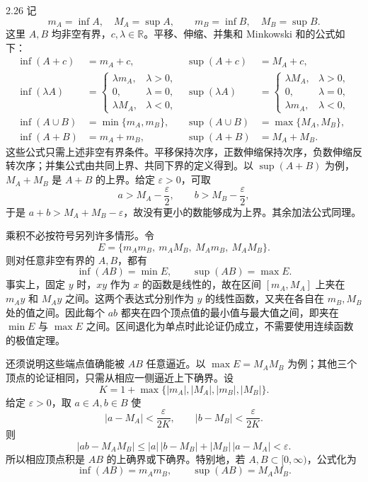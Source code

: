 \begin{solution}{2.26}
记
\[
 m_A=\inf A,\quad M_A=\sup A,
 \qquad m_B=\inf B,\quad M_B=\sup B.
\]
这里 \(A,B\) 均非空有界，\(c,\lambda\in\mathbb R\)。平移、伸缩、并集和 Minkowski 和的公式如下：
\begin{align*}
 \inf(A+c)&=m_A+c,& \sup(A+c)&=M_A+c,\\
 \inf(\lambda A)&=
 \begin{cases}
  \lambda m_A,&\lambda>0,\\
  0,&\lambda=0,\\
  \lambda M_A,&\lambda<0,
 \end{cases}
 &
 \sup(\lambda A)&=
 \begin{cases}
  \lambda M_A,&\lambda>0,\\
  0,&\lambda=0,\\
  \lambda m_A,&\lambda<0,
 \end{cases}\\
 \inf(A\cup B)&=\min\{m_A,m_B\},&
 \sup(A\cup B)&=\max\{M_A,M_B\},\\
 \inf(A+B)&=m_A+m_B,&
 \sup(A+B)&=M_A+M_B.
\end{align*}
这些公式只需上述非空有界条件。平移保持次序，正数伸缩保持次序，负数伸缩反转次序；并集公式由共同上界、共同下界的定义得到。以 \(\sup(A+B)\) 为例，\(M_A+M_B\) 是 \(A+B\) 的上界。给定 \(\varepsilon>0\)，可取
\[
 a>M_A-\frac{\varepsilon}{2},\qquad
 b>M_B-\frac{\varepsilon}{2},
\]
于是 \(a+b>M_A+M_B-\varepsilon\)，故没有更小的数能够成为上界。其余加法公式同理。

乘积不必按符号另列许多情形。令
\[
 E=\{m_Am_B,\ m_AM_B,\ M_Am_B,\ M_AM_B\}.
\]
则对任意非空有界的 \(A,B\)，都有
\[
 \inf(AB)=\min E,
 \qquad
 \sup(AB)=\max E.
\]
事实上，固定 \(y\) 时，\(xy\) 作为 \(x\) 的函数是线性的，故在区间 \([m_A,M_A]\) 上夹在 \(m_Ay\) 和 \(M_Ay\) 之间。这两个表达式分别作为 \(y\) 的线性函数，又夹在各自在 \(m_B,M_B\) 处的值之间。因此每个 \(ab\) 都夹在四个顶点值的最小值与最大值之间，即夹在 \(\min E\) 与 \(\max E\) 之间。区间退化为单点时此论证仍成立，不需要使用连续函数的极值定理。

还须说明这些端点值确能被 \(AB\) 任意逼近。以 \(\max E=M_AM_B\) 为例；其他三个顶点的论证相同，只需从相应一侧逼近上下确界。设
\[
 K=1+\max\{|m_A|,|M_A|,|m_B|,|M_B|\}.
\]
给定 \(\varepsilon>0\)，取 \(a\in A,b\in B\) 使
\[
 |a-M_A|<\frac{\varepsilon}{2K},
 \qquad
 |b-M_B|<\frac{\varepsilon}{2K}.
\]
则
\[
 |ab-M_AM_B|
 \le |a|\,|b-M_B|+|M_B|\,|a-M_A|
 <\varepsilon.
\]
所以相应顶点积是 \(AB\) 的上确界或下确界。特别地，若 \(A,B\subset[0,\infty)\)，公式化为
\[
 \inf(AB)=m_Am_B,
 \qquad
 \sup(AB)=M_AM_B.
\]
\end{solution}

